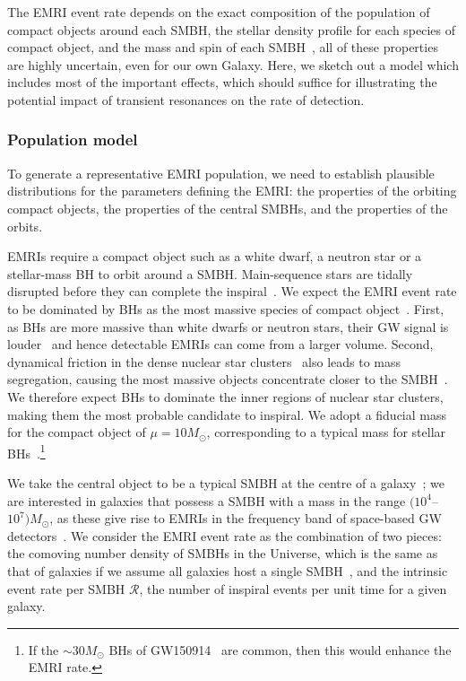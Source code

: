 \documentclass[aps,prd,amsfonts,amssymb,amsmath,nofootinbib,showpacs,superscriptaddress,twocolumn,floatfix]{revtex4-1}
\begin{document}
The EMRI event rate depends on the exact composition of the population of compact objects around each SMBH, the stellar density profile for each species of compact object, and the mass and spin of each SMBH~\cite{Alexander2005}, all of these properties are highly uncertain, even for our own Galaxy. Here, we sketch out a model which includes most of the important effects, which should suffice for illustrating the potential impact of transient resonances on the rate of detection.

\subsubsection{Population model}

To generate a representative EMRI population, we need to establish plausible distributions for the parameters defining the EMRI: the properties of the orbiting compact objects, the properties of the central SMBHs, and the properties of the orbits. 

EMRIs require a compact object such as a white dwarf, a neutron star or a stellar-mass BH to orbit around a SMBH. Main-sequence stars are tidally disrupted before they can complete the inspiral~\cite{Rees1988,Sigurdsson1997}. We expect the EMRI event rate to be dominated by BHs as the most massive species of compact object~\cite{Gair2004}. First, as BHs are more massive than white dwarfs or neutron stars, their GW signal is louder~\cite{Peters1963,Barack2004} and hence detectable EMRIs can come from a larger volume. Second, dynamical friction in the dense nuclear star clusters~\cite{Chandrasekhar1960,Antonini2011} also leads to mass segregation, causing the most massive objects concentrate closer to the SMBH~\cite{Bahcall1977,Freitag2006,Alexander2009}. We therefore expect BHs to dominate the inner regions of nuclear star clusters, making them the most probable candidate to inspiral. We adopt a fiducial mass for the compact object of $\mu = 10 M_\odot$, corresponding to a typical mass for stellar BHs~\cite{Casares2014,Corral-Santana2016,Tetarenko2016,Abbott2016d}.\footnote{If the $\sim30 M_\odot$ BHs of GW150914~\cite{Abbott2016f,Abbott2016d} are common, then this would enhance the EMRI rate.}

We take the central object to be a typical SMBH at the centre of a galaxy~\cite{Kormendy1995,Ferrarese2005}; we are interested in galaxies that possess a SMBH with a mass in the range $(10^{4}$--$10^7) M_\odot$, as these give rise to EMRIs in the frequency band of space-based GW detectors~\cite{Amaro-Seoane2007,Amaro-Seoane2012a}. We consider the EMRI event rate as the combination of two pieces: the comoving number density of SMBHs in the Universe, which is the same as that of galaxies if we assume all galaxies host a single SMBH~\cite{Lynden-Bell1971,Soltan1982}, and the intrinsic event rate per SMBH $\mathcal{R}$, the number of inspiral events per unit time for a given galaxy.
\end{document}
